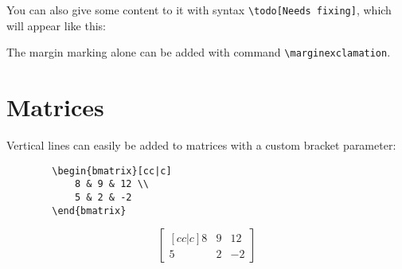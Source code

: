 \documentclass[11pt,a4paper]{article}
\begin{document}
\todo

You can also give some content to it with syntax \verb!\todo[Needs fixing]!, which will appear like this:


The margin marking alone can be added with command \verb!\marginexclamation!.

\section{Matrices}
Vertical lines can easily be added to matrices with a custom bracket parameter:

\begin{minipage}{0.5\textwidth}
    \begin{verbatim}
        \begin{bmatrix}[cc|c]
            8 & 9 & 12 \\
            5 & 2 & -2
        \end{bmatrix}
    \end{verbatim}
\end{minipage}%
\hfill
\begin{minipage}{0.5\textwidth}
    \begin{equation*}
        \begin{bmatrix}[cc|c]
            8 & 9 & 12 \\
            5 & 2 & -2
        \end{bmatrix}
    \end{equation*}
\end{minipage}
\end{document}
